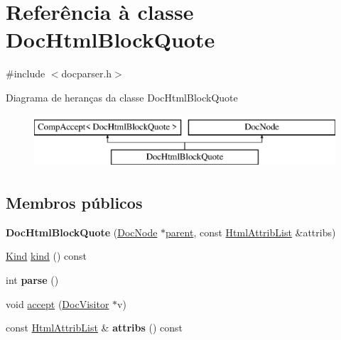 \hypertarget{class_doc_html_block_quote}{\section{Referência à classe Doc\-Html\-Block\-Quote}
\label{class_doc_html_block_quote}
}


{\ttfamily \#include $<$docparser.\-h$>$}

Diagrama de heranças da classe Doc\-Html\-Block\-Quote\begin{figure}[H]
\begin{center}
\leavevmode
\includegraphics[height=2.000000cm]{class_doc_html_block_quote}
\end{center}
\end{figure}
\subsection*{Membros públicos}
\begin{DoxyCompactItemize}
\item 
\hypertarget{class_doc_html_block_quote_acd90b4b9875edada791a6a8ee8960dfe}{{\bfseries Doc\-Html\-Block\-Quote} (\hyperlink{class_doc_node}{Doc\-Node} $\ast$\hyperlink{class_doc_node_abd7f070d6b0a38b4da71c2806578d19d}{parent}, const \hyperlink{class_html_attrib_list}{Html\-Attrib\-List} \&attribs)}\label{class_doc_html_block_quote_acd90b4b9875edada791a6a8ee8960dfe}

\item 
\hyperlink{class_doc_node_aa10c9e8951b8ccf714a59ec321bdac5b}{Kind} \hyperlink{class_doc_html_block_quote_aa9d037bed9f9a083d0cd01485637d843}{kind} () const 
\item 
\hypertarget{class_doc_html_block_quote_a67007fc2be130666fbf3b065022756f4}{int {\bfseries parse} ()}\label{class_doc_html_block_quote_a67007fc2be130666fbf3b065022756f4}

\item 
void \hyperlink{class_doc_html_block_quote_a7ba716e854ae2f8f87a4eb2140e302b6}{accept} (\hyperlink{class_doc_visitor}{Doc\-Visitor} $\ast$v)
\item 
\hypertarget{class_doc_html_block_quote_aae3c838ea3d3273b35d07e9965a8985e}{const \hyperlink{class_html_attrib_list}{Html\-Attrib\-List} \& {\bfseries attribs} () const }\label{class_doc_html_block_quote_aae3c838ea3d3273b35d07e9965a8985e}

\end{DoxyCompactItemize}
